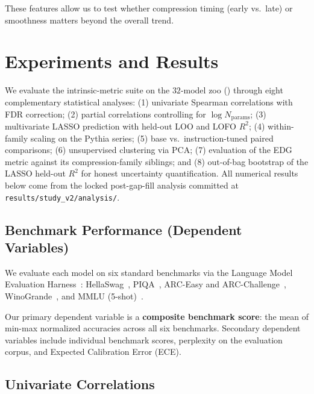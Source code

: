 \documentclass[preprint]{neurips_2025}
\begin{document}
\noindent These features allow us to test whether compression timing (early vs.\ late) or smoothness matters beyond the overall trend.

\section{Experiments and Results}
\label{sec:experiments}

We evaluate the intrinsic-metric suite on the $32$-model zoo () through eight complementary statistical analyses: (1) univariate Spearman correlations with FDR correction; (2) partial correlations controlling for $\log N_{\text{params}}$; (3) multivariate LASSO prediction with held-out LOO and LOFO $R^2$; (4) within-family scaling on the Pythia series; (5) base vs.\ instruction-tuned paired comparisons; (6) unsupervised clustering via PCA; (7) evaluation of the EDG metric against its compression-family siblings; and (8) out-of-bag bootstrap of the LASSO held-out $R^2$ for honest uncertainty quantification. All numerical results below come from the locked post-gap-fill analysis committed at \texttt{results/study\_v2/analysis/}.

\subsection{Benchmark Performance (Dependent Variables)}
\label{sec:benchmarks}

We evaluate each model on six standard benchmarks via the Language Model Evaluation Harness~\citep{eval-harness}: HellaSwag~\citep{zellers2019hellaswag}, PIQA~\citep{bisk2020piqa}, ARC-Easy and ARC-Challenge~\citep{clark2018arc}, WinoGrande~\citep{sakaguchi2021winogrande}, and MMLU (5-shot)~\citep{hendrycks2021measuring}.

Our primary dependent variable is a \textbf{composite benchmark score}: the mean of min-max normalized accuracies across all six benchmarks.
Secondary dependent variables include individual benchmark scores, perplexity on the evaluation corpus, and Expected Calibration Error (ECE).

\subsection{Univariate Correlations}
\label{sec:univariate}
\end{document}
